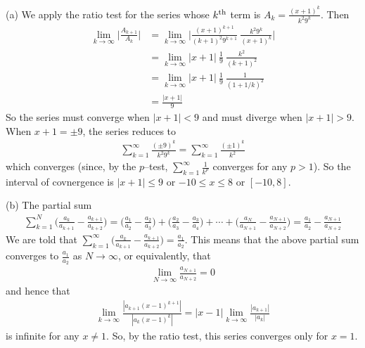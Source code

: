 \begin{solution} (a)
We apply the ratio test for the series whose $k^{\rm th}$
term is $A_k=\frac{(x+1)^k}{k^2 9^k}$. Then
\begin{align*}
\lim_{k\rightarrow\infty}\bigg|\frac{A_{k+1}}{A_k}\bigg|
&=\lim_{k\rightarrow\infty} \bigg|\frac{(x+1)^{k+1}}{(k+1)^2 9^{k+1}}
                                  \ \frac{k^2 9^k}{(x+1)^k}\bigg| \\
&=\lim_{k\rightarrow\infty} |x+1|\ \frac{1}{9}\ \frac{k^2}{(k+1)^2} \\
&=\lim_{k\rightarrow\infty} |x+1|\ \frac{1}{9}\ \frac{1}{(1+1/k)^2} \\
&=\frac{|x+1|}{9}
\end{align*}
So the series must converge when $|x+1|<9$ and must diverge when $|x+1|>9$.
When $x+1=\pm 9$, the series reduces to
\begin{align*}
\sum_{k=1}^\infty \frac{(\pm 9)^k}{k^2 9^k}
=\sum_{k=1}^\infty \frac{(\pm 1)^k}{k^2}
\end{align*}
which converges (since, by the $p$--test, $\sum_{k=1}^\infty\frac{1}{k^p}$ converges for
any $p>1$). So the interval of covnergence is $|x+1|\le 9$
or $-10\le x\le 8$  or $[-10,8]$.



\noindent (b)
The partial sum
\begin{align*}
\sum_{k=1}^N\Big(\frac{a_k}{a_{k+1}}
                         -\frac{a_{k+1}}{a_{k+2}}\Big)
=\Big(\frac{a_1}{a_2}-\frac{a_2}{a_3}\Big)
 +\Big(\frac{a_2}{a_3}-\frac{a_3}{a_4}\Big)
+\cdots+ \Big(\frac{a_N}{a_{N+1}}-\frac{a_{N+1}}{a_{N+2}}\Big)
=\frac{a_1}{a_2}-\frac{a_{N+1}}{a_{N+2}}
\end{align*}
We are told that ${\displaystyle \sum_{k=1}^\infty \Big(\frac{a_k}{a_{k+1}}
                         -\frac{a_{k+1}}{a_{k+2}}\Big)
   =\frac{a_1}{a_2} }$. This means that the above partial sum converges to
$\frac{a_1}{a_2}$ as $N\rightarrow\infty$, or equivalently, that
\begin{align*}
\lim_{N\rightarrow\infty}\frac{a_{N+1}}{a_{N+2}}=0
\end{align*}
and hence that
\begin{align*}
\lim_{k\rightarrow\infty}\frac{|a_{k+1}(x-1)^{k+1}|}{|a_k(x-1)^k|}
=|x-1|\lim_{k\rightarrow\infty}\frac{|a_{k+1}|}{|a_k|}
\end{align*}
is infinite for any $x\ne 1$. So, by the ratio test, this series converges only for $x=1$.
\end{solution}


